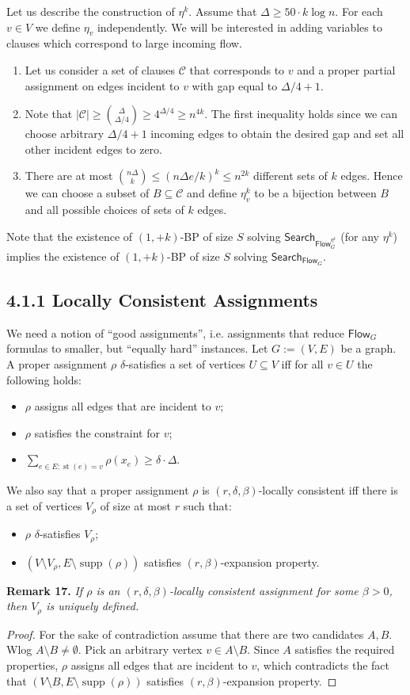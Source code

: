 \documentclass[10pt,a4paper]{article}
\newcommand{\Search}{\mathsf{Search}}
\newcommand{\Flow}{\mathsf{Flow}}
\newcommand{\supp}{\operatorname{supp}}
\newcommand{\st}{\operatorname{st}}
\newenvironment{result}[1]{\par\medskip\noindent\textbf{#1.}\itshape}{\par\medskip}
\begin{document}
Let us describe the construction of $\eta^k$. Assume that $\Delta\ge50\cdot k\log n$. For each $v\in V$ we define $\eta_v$ independently. We will be interested in adding variables to clauses which correspond to large incoming flow.
\begin{enumerate}
\item Let us consider a set of clauses $\mathcal C$ that corresponds to $v$ and a proper partial assignment on edges incident to $v$ with gap equal to $\Delta/4+1$.
\item Note that $|\mathcal C|\ge\binom{\Delta}{\Delta/4}\ge4^{\Delta/4}\ge n^{4k}$. The first inequality holds since we can choose arbitrary $\Delta/4+1$ incoming edges to obtain the desired gap and set all other incident edges to zero.
\item There are at most $\binom{n\Delta}{k}\le(n\Delta e/k)^k\le n^{2k}$ different sets of $k$ edges. Hence we can choose a subset of $B\subseteq\mathcal C$ and define $\eta_v^k$ to be a bijection between $B$ and all possible choices of sets of $k$ edges.
\end{enumerate}
Note that the existence of $(1,+k)$-BP of size $S$ solving $\Search_{\Flow_G^{\eta^k}}$ (for any $\eta^k$) implies the existence of $(1,+k)$-BP of size $S$ solving $\Search_{\Flow_G}$.
\subsection*{4.1.1 Locally Consistent Assignments}
We need a notion of ``good assignments'', i.e. assignments that reduce $\Flow_G$ formulas to smaller, but ``equally hard'' instances.
Let $G:=(V,E)$ be a graph. A proper assignment $\rho$ $\delta$-satisfies a set of vertices $U\subseteq V$ iff for all $v\in U$ the following holds:
\begin{itemize}\item $\rho$ assigns all edges that are incident to $v$;
\item $\rho$ satisfies the constraint for $v$;
\item $\sum_{e\in E:\st(e)=v}\rho(x_e)\ge\delta\cdot\Delta$.\end{itemize}
We also say that a proper assignment $\rho$ is $(r,\delta,\beta)$-locally consistent iff there is a set of vertices $V_\rho$ of size at most $r$ such that:
\begin{itemize}\item $\rho$ $\delta$-satisfies $V_\rho$;
\item $(V\setminus V_\rho,E\setminus\supp(\rho))$ satisfies $(r,\beta)$-expansion property.\end{itemize}
\begin{result}{Remark 17}
If $\rho$ is an $(r,\delta,\beta)$-locally consistent assignment for some $\beta>0$, then $V_\rho$ is uniquely defined.
\end{result}
\begin{proof}
For the sake of contradiction assume that there are two candidates $A,B$. Wlog $A\setminus B\ne\emptyset$. Pick an arbitrary vertex $v\in A\setminus B$. Since $A$ satisfies the required properties, $\rho$ assigns all edges that are incident to $v$, which contradicts the fact that $(V\setminus B,E\setminus\supp(\rho))$ satisfies $(r,\beta)$-expansion property.
\end{proof}
\end{document}
